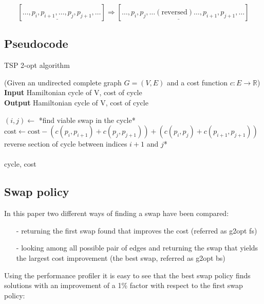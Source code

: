 $$[\ldots,p_i,\underline{p_{i+1},\ldots,p_j},p_{j+1},\ldots]\Rightarrow[\ldots,p_i,\underline{p_j,\ldots(\mbox{reversed})\ldots,p_{i+1}},p_{j+1},\ldots]$$

\subsection{Pseudocode}
\begin{algorithm}
    \caption{TSP 2-opt algorithm}
    (Given an undirected complete graph $G=(V,E)$ and a cost function $c:E\rightarrow\mathbb{R}$)\\

    \textbf{Input} Hamiltonian cycle of V, cost of cycle\\
    \textbf{Output} Hamiltonian cycle of V, cost of cycle\\
    \begin{algorithmic}

            \State $(i, j)\gets$ *find viable swap in the cycle*
            \State $\mbox{cost}\gets\mbox{cost}-(c(p_i,p_{i+1})+c(p_j,p_{j+1}))+(c(p_i,p_{j})+c(p_{i+1},p_{j+1}))$
            \State *reverse section of cycle between indices $i+1$ and $j$*
        \EndWhile\\\\

        \Return cycle, cost

    \end{algorithmic}
\end{algorithm}

\subsection{Swap policy}

In this paper two different ways of finding a swap have been compared:

\begin{enumerate}
    \item[-] returning the first swap found that improves the cost (referred as g2opt fs)
    \item[-] looking among all possible pair of edges and returning the swap that yields the largest cost improvement (the best swap, referred as g2opt bs)
\end{enumerate}

Using the performance profiler it is easy to see that the best swap policy finds solutions with an improvement of a 1\% factor with respect to the first swap policy:

